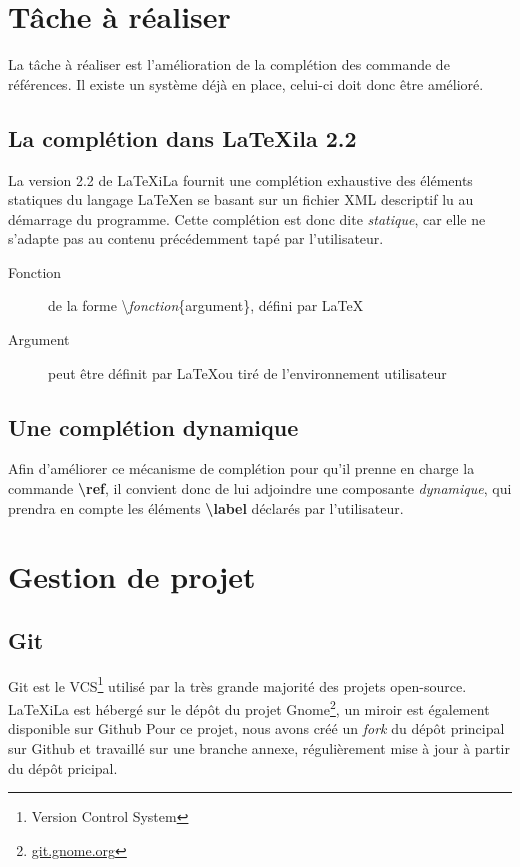 \documentclass[a4paper,11pt]{report}
\begin{document}
\section{Tâche à réaliser} %
\label{sec:tache_a_realiser}
La tâche à réaliser est l'amélioration de la complétion des commande de références. Il existe un système déjà en place, celui-ci doit donc être amélioré.

\subsection{La complétion dans LaTeXila 2.2}
\label{sub:completion}
La version 2.2 de LaTeXiLa fournit une complétion exhaustive des éléments statiques du langage \LaTeX  en se basant sur un fichier XML descriptif lu au démarrage du programme.
Cette complétion est donc dite \textit{statique}, car elle ne s'adapte pas au contenu précédemment tapé par l'utilisateur. 

\begin{description}
  \item[Fonction] de la forme \textbackslash\textit{fonction}\{argument\}, défini par \LaTeX
  \item[Argument] peut être définit par \LaTeX  ou tiré de l'environnement utilisateur
\end{description}

\subsection{Une complétion dynamique}
\label{sub:completion_dyn}
Afin d'améliorer ce mécanisme de complétion pour qu'il prenne en charge la commande \textbf{\textbackslash{}ref}, il convient donc de lui adjoindre une composante \textit{dynamique}, qui prendra en compte les éléments \textbf{\textbackslash{}label} déclarés par l'utilisateur.

\section{Gestion de projet} %

\subsection{Git}
\label{sub:git}
Git est le VCS\footnote{Version Control System} utilisé par la très grande majorité des projets open-source. LaTeXiLa est hébergé sur le dépôt du projet Gnome\footnote{\url{git.gnome.org}}, un miroir est également disponible sur Github %
Pour ce projet, nous avons créé un \textit{fork} du dépôt principal sur Github et travaillé sur une branche annexe, régulièrement mise à jour à partir du dépôt pricipal.
\end{document}
